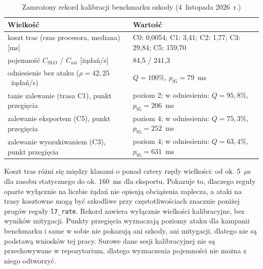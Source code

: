 \documentclass[a4paper,12pt]{article}
\begin{document}
\begin{table}[H]
\centering
\small
\caption{Zamrożony rekord kalibracji benchmarku szkody (4~listopada 2026~r.)}\label{tab:kalibracja}
\begin{tabularx}{\linewidth}{@{}L{6.2cm}Y@{}}
\toprule
Wielkość & Wartość \\
\midrule
koszt tras (czas procesora, mediana) [ms] & C0: 0,0054; C1: 3,41; C2: 1,77; C3: 29,84; C5: 159,70 \\
pojemność $C_{\mathrm{SLO}}$ / $C_{\mathrm{sat}}$ [żądań/s] & 84,5 / 241,3 \\
odniesienie bez ataku ($\rho = 42{,}25$~żądań/s) & $Q = 100\%$, $p_{95} = 79$~ms \\
tanie zalewanie (trasa C1), punkt przegięcia & poziom 2; w odniesieniu: $Q = 95{,}8\%$, $p_{95} = 206$~ms \\
zalewanie eksportem (C5), punkt przegięcia & poziom 4; w odniesieniu: $Q = 75{,}3\%$, $p_{95} = 252$~ms \\
zalewanie wyszukiwaniem (C3), punkt przegięcia & poziom 4; w odniesieniu: $Q = 63{,}4\%$, $p_{95} = 631$~ms \\
\bottomrule
\end{tabularx}
\end{table}

Koszt tras różni się między klasami o ponad cztery rzędy wielkości: od ok. 5~$\mu$s dla zasobu statycznego do ok. 160~ms dla eksportu. Pokazuje to, dlaczego reguły oparte wyłącznie na liczbie żądań nie opisują obciążenia zaplecza, a ataki na trasy kosztowne mogą być szkodliwe przy częstotliwościach znacznie poniżej progów reguły \texttt{l7\_rate}. Rekord zawiera wyłącznie wielkości kalibracyjne, bez wyników mitygacji. Punkty przegięcia wyznaczają poziomy ataku dla kampanii benchmarku i same w sobie nie pokazują ani szkody, ani mitygacji, dlatego nie są podstawą wniosków tej pracy. Surowe dane sesji kalibracyjnej nie są przechowywane w repozytorium, dlatego wyznaczenia pojemności nie można z niego odtworzyć.
\end{document}
